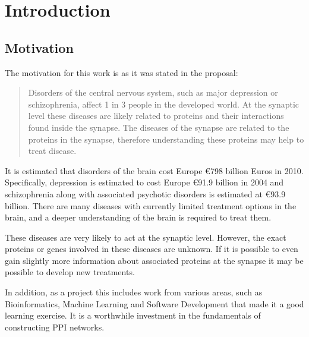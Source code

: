 \chapter{Introduction}
\label{introduction}



\section{Motivation}

The motivation for this work is as it was stated in the proposal\autocite{proposal}:

\begin{quote}
    Disorders of the central nervous system, such as major depression or schizophrenia, affect 1 in 3 people in the developed world.
    At the synaptic level these diseases are likely related to proteins and their interactions found inside the synapse\autocites{chua_architecture_2010,synsys}.
    The diseases of the synapse are related to the proteins in the synapse\autocite{chua_architecture_2010}, therefore understanding these proteins may help to treat disease\autocite{li_interaction_2010}.
\end{quote}

It is estimated that disorders of the brain cost Europe €798 billion Euros in 2010\autocite{olesen_economic_2012}.
Specifically, depression is estimated to cost Europe €91.9 billion in 2004 and schizophrenia along with associated psychotic disorders is estimated at €93.9 billion.
There are many diseases with currently limited treatment options in the brain, and a deeper understanding of the brain is required to treat them.

These diseases are very likely to act at the synaptic level\autocites{chua_architecture_2010,synsys}.
However, the exact proteins or genes involved in these diseases are unknown.
If it is possible to even gain slightly more information about associated proteins at the synapse it may be possible to develop new treatments\autocite{li_interaction_2010}.

In addition, as a project this includes work from various areas, such as Bioinformatics, Machine Learning and Software Development that made it a good learning exercise.
It is a worthwhile investment in the fundamentals of constructing PPI networks.

